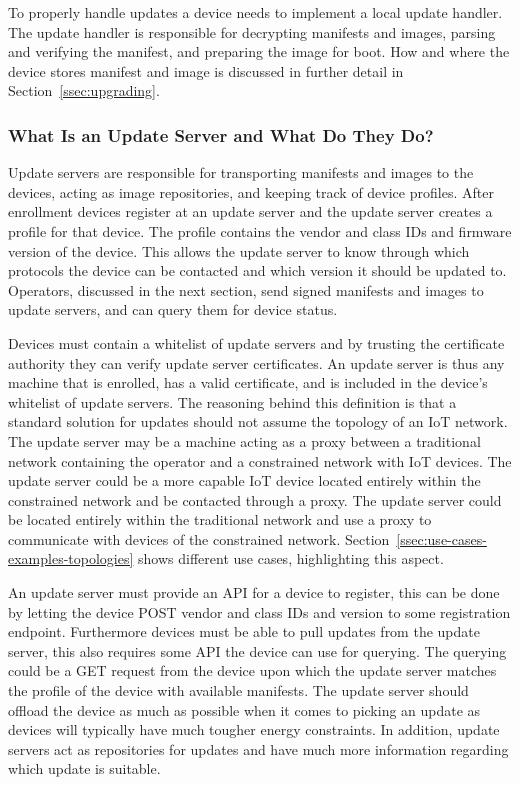 \documentclass[0-thesis.tex]{subfiles}
\begin{document}
To properly handle updates a device needs to implement a local update handler. The update
handler is responsible for decrypting manifests and images, parsing and verifying the
manifest, and preparing the image for boot. How and where the device stores manifest and
image is discussed in further detail in Section~\ref{ssec:upgrading}.

\subsubsection{What Is an Update Server and What Do They Do?}
\label{sssec:what-is-an-update-server}
Update servers are responsible for transporting manifests and images to the devices,
acting as image repositories, and keeping track of device profiles. After enrollment
devices register at an update server and the update server creates a profile for that
device. The profile contains the vendor and class IDs and firmware version of the device.
This allows the update server to know through which protocols the device can be contacted
and which version it should be updated to. Operators, discussed in the next section, send
signed manifests and images to update servers, and can query them for device status.

Devices must contain a whitelist of update servers and by trusting the certificate
authority they can verify update server certificates. An update server is thus any machine
that is enrolled, has a valid certificate, and is included in the device's whitelist of
update servers. The reasoning behind this definition is that a standard solution for
updates should not assume the topology of an IoT network. The update server may be a
machine acting as a proxy between a traditional network containing the operator and a
constrained network with IoT devices. The update server could be a more capable IoT device
located entirely within the constrained network and be contacted through a proxy. The
update server could be located entirely within the traditional network and use a proxy to
communicate with devices of the constrained network.
Section~\ref{ssec:use-cases-examples-topologies} shows different use cases, highlighting
this aspect.

An update server must provide an API for a device to register, this can be done by letting
the device POST vendor and class IDs and version to some registration endpoint.
Furthermore devices must be able to pull updates from the update server, this also
requires some API the device can use for querying. The querying could be a GET request
from the device upon which the update server matches the profile of the device with
available manifests. The update server should offload the device as much as possible when
it comes to picking an update as devices will typically have much tougher energy
constraints. In addition, update servers act as repositories for updates and have much
more information regarding which update is suitable.
\end{document}
